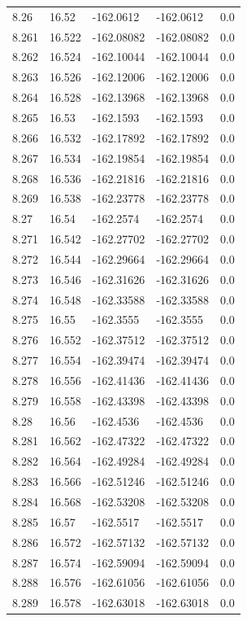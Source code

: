 \begin{tabular}{lllll}
8.26 & 16.52 & -162.0612 & -162.0612 & 0.0 \\
8.261 & 16.522 & -162.08082 & -162.08082 & 0.0 \\
8.262 & 16.524 & -162.10044 & -162.10044 & 0.0 \\
8.263 & 16.526 & -162.12006 & -162.12006 & 0.0 \\
8.264 & 16.528 & -162.13968 & -162.13968 & 0.0 \\
8.265 & 16.53 & -162.1593 & -162.1593 & 0.0 \\
8.266 & 16.532 & -162.17892 & -162.17892 & 0.0 \\
8.267 & 16.534 & -162.19854 & -162.19854 & 0.0 \\
8.268 & 16.536 & -162.21816 & -162.21816 & 0.0 \\
8.269 & 16.538 & -162.23778 & -162.23778 & 0.0 \\
8.27 & 16.54 & -162.2574 & -162.2574 & 0.0 \\
8.271 & 16.542 & -162.27702 & -162.27702 & 0.0 \\
8.272 & 16.544 & -162.29664 & -162.29664 & 0.0 \\
8.273 & 16.546 & -162.31626 & -162.31626 & 0.0 \\
8.274 & 16.548 & -162.33588 & -162.33588 & 0.0 \\
8.275 & 16.55 & -162.3555 & -162.3555 & 0.0 \\
8.276 & 16.552 & -162.37512 & -162.37512 & 0.0 \\
8.277 & 16.554 & -162.39474 & -162.39474 & 0.0 \\
8.278 & 16.556 & -162.41436 & -162.41436 & 0.0 \\
8.279 & 16.558 & -162.43398 & -162.43398 & 0.0 \\
8.28 & 16.56 & -162.4536 & -162.4536 & 0.0 \\
8.281 & 16.562 & -162.47322 & -162.47322 & 0.0 \\
8.282 & 16.564 & -162.49284 & -162.49284 & 0.0 \\
8.283 & 16.566 & -162.51246 & -162.51246 & 0.0 \\
8.284 & 16.568 & -162.53208 & -162.53208 & 0.0 \\
8.285 & 16.57 & -162.5517 & -162.5517 & 0.0 \\
8.286 & 16.572 & -162.57132 & -162.57132 & 0.0 \\
8.287 & 16.574 & -162.59094 & -162.59094 & 0.0 \\
8.288 & 16.576 & -162.61056 & -162.61056 & 0.0 \\
8.289 & 16.578 & -162.63018 & -162.63018 & 0.0 \\

\end{tabular}
